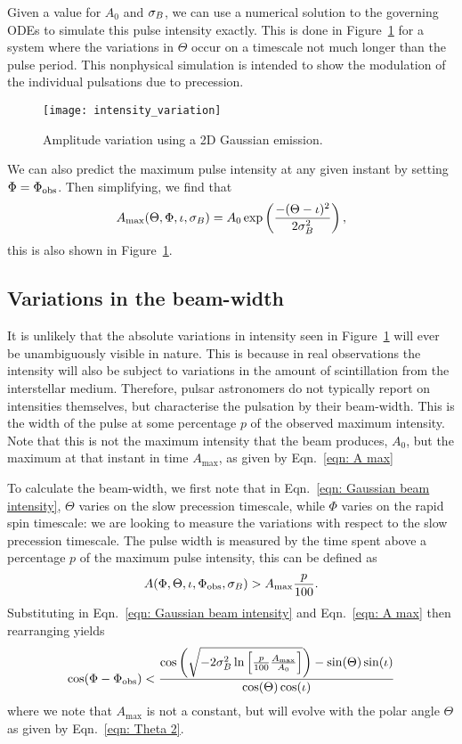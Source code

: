 \documentclass[../full_thesis/full_thesis.tex]{subfiles}
\begin{document}
Given a value for $A_0$ and $\sigma_{B}$, we can use a numerical solution to the
governing ODEs to simulate this pulse intensity exactly. This is done in
Figure~\ref{fig: intensity variation} for a system where the variations in
$\Theta$ occur on a timescale not much longer than the pulse period. This
nonphysical simulation is intended to show the modulation of the individual
pulsations due to precession.
\begin{figure}[htb]
\centering
\texttt{[image: intensity\_variation]}
\caption{Amplitude variation using a 2D Gaussian emission.}
\label{fig: intensity variation}
\end{figure}
We can also predict the maximum pulse intensity at any given instant by setting
$\Phi=\Phi_{\mathrm{obs}}$. Then simplifying, we find that
\begin{align}
A_{\mathrm{max}}(\Theta, \Phi, \iota, \sigma_{B}) =
A_{0}\exp\left(\frac{-(\Theta-\iota)^{2}}{2\sigma_{B}^{2}}\right),
\label{eqn: A max}
\end{align}
this is also shown in Figure~\ref{fig: intensity variation}.

\subsection{Variations in the beam-width}
\label{sec: numerical beam-width}
It is unlikely that the absolute variations in intensity seen in
Figure~\ref{fig: intensity variation} will ever be unambiguously visible in
nature. This is because in real observations the intensity will also be subject
to variations in the amount of scintillation from the interstellar medium.
Therefore, pulsar astronomers do not typically report on intensities
themselves, but characterise the pulsation by their beam-width. This is the
width of the pulse at some percentage $p$ of the observed maximum intensity.
Note that this is not the maximum intensity that the beam produces, $A_0$, but
the maximum at that instant in time $A_{\mathrm{max}}$, as given by
Eqn.~\eqref{eqn: A max}

To calculate the beam-width, we first note that in Eqn.~\eqref{eqn: Gaussian
beam intensity}, $\Theta$ varies on the slow precession timescale, while $\Phi$
varies on the rapid spin timescale: we are looking to measure the variations
with respect to the slow precession timescale.  The pulse width is measured by
the time spent above a percentage $p$ of the maximum pulse intensity, this can
be defined as
\begin{align}
A(\Phi, \Theta, \iota, \Phi_{\mathrm{obs}}, \sigma_{B}) > A_{\textrm{max}} \frac{p}{100}.
\end{align}
Substituting in Eqn.~\eqref{eqn: Gaussian beam intensity} and Eqn.~\eqref{eqn: A max}
then rearranging yields
\begin{equation}
\cos(\Phi - \Phi_{\mathrm{obs}}) < \frac{
\cos\left(
\sqrt{-2\sigma_{B}^{2}
\ln\left[\frac{p}{100}\frac{A_\textrm{max}}{A_0}\right]}\right) -
\sin(\Theta)\sin(\iota)} {\cos(\Theta)\cos(\iota)}
\label{eqn: 6737}
\end{equation}
where we note that $A_\textrm{max}$ is not a constant, but will evolve with the
polar angle $\Theta$ as given by Eqn.~\eqref{eqn: Theta 2}.
\end{document}
